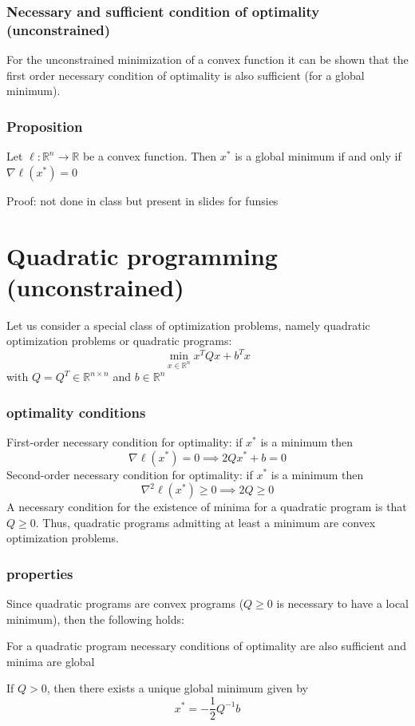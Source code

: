 \documentclass[openany]{book}
\newcommand{\R}{\mathbb{R}} %
\theoremstyle{definition}
\theoremstyle{remark}
\begin{document}
\subsubsection{Necessary and sufficient condition of optimality (unconstrained)}
For the unconstrained minimization of a convex function it can be shown that the first order necessary condition of optimality is also sufficient (for a global minimum).
\subsubsection{Proposition}
Let $\ell:\R^n \to \R$ be a convex function. Then $x^*$ is a global minimum if and only if $\nabla\ell(x^*)=0$

Proof: not done in class but present in slides for funsies

\section{Quadratic programming (unconstrained)}
Let us consider a special class of optimization problems, namely quadratic optimization problems or quadratic programs: 
\[
    \min_{x\in\R^n}x^TQx+b^Tx
\]
with $Q=Q^T\in\R^{n\times n}$ and $b\in\R^n$


\subsubsection{optimality conditions}
First-order necessary condition for optimality: if $x^*$ is a minimum then 
\[
    \nabla \ell(x^*)=0 \implies 2Qx^*+b=0
\]
Second-order necessary condition for optimality: if $x^*$ is a minimum then 
\[
    \nabla^2\ell(x^*)\geq 0 \implies 2Q\geq0
\]
A necessary condition for the existence of minima for a quadratic program is that $Q\geq 0$. Thus, quadratic programs admitting at least a minimum are convex optimization problems.


\subsubsection{properties}
Since quadratic programs are convex programs ($Q\geq 0$ is necessary to have a local minimum), then the following holds: 
\begin{center}
     For a quadratic program necessary conditions of optimality are also sufficient and minima are global
\end{center}
If $Q>0$, then there exists a unique global minimum given by 
\[
    x^* = -\displaystyle\frac{1}{2}Q^{-1}b
\]
\end{document}
